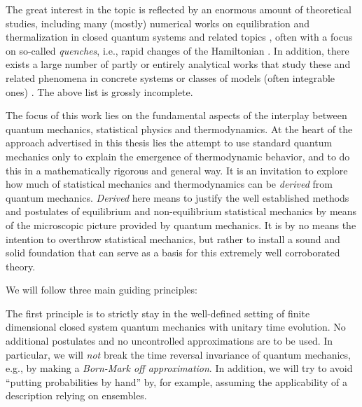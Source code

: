 \documentclass[a4paper,12pt,listof=totoc,index=totoc,bibliography=totoc,headsepline=false,headings=normal,BCOR16.153846mm,DIV12,headinclude,twoside,cleardoublepage=empty,numbers=noenddot,final]{scrreprt}
\theoremstyle{mystyle}
\numberwithin{equation}{section}
\numberwithin{figure}{section}
\numberwithin{lemma}{section}
\numberwithin{theorem}{section}
\numberwithin{corollary}{section}
\numberwithin{definition}{section}
\numberwithin{conjecture}{section}
\numberwithin{observation}{section}
\newcommand{\+}{\mkern2mu}
\DeclareMathOperator{\1}{\mathds{1}}
\begin{document}
The great interest in the topic is reflected by an enormous amount of theoretical studies, including many (mostly) numerical works on equilibration and thermalization in closed quantum systems and related topics \cite{Sirker2013,1109.5904v1,1110.4690v1,Rigol07,Zhuang2013,PhysRevE.81.06,Lesanovsky10,Beugeling2013,1112.3424v1.pd,Beugeling2013,Yukalov2011,Ikeda2013a,Fine2013,Jensen1985}, often with a focus on so-called \emph{quenches}, i.e., rapid changes of the Hamiltonian \cite{Moeckel2008,Kollath07,Rigol08,Rigol09,1011.0781v1,Venuti09,1108.2703v1,1109.5904v1,Rigol11,Rigol2006,Cassidy11,1102.0528v1,Torres-Herrera2013,1103.0787v1,1102.3651v1,1108.0928v1,Mazza2013}.
In addition, there exists a large number of partly or entirely analytical works that study these and related phenomena in concrete systems or classes of models (often integrable ones) \cite{Sengupta2004,Flesch08,Ates2011,Fagotti2012,Calabrese2007,Cazalilla2006,Fioretto2010,1104.0154v1,Cazalilla11,Eckstein2008,Campos10,1206.2408v1,Karzig2010,Iucci2010,Iucci2010,Iucci2009,Geiger2013,Queisser2013,Kehrein2013}.
The above list is grossly incomplete.

The focus of this work lies on the fundamental aspects of the interplay between quantum mechanics, statistical physics and thermodynamics.
At the heart of the approach advertised in this thesis lies the attempt to use standard quantum mechanics only to explain the emergence of thermodynamic behavior, and to do this in a mathematically rigorous and general way.
It is an invitation to explore how much of statistical mechanics and thermodynamics can be \emph{derived} from quantum mechanics.
\emph{Derived} here means to justify the well established methods and postulates of equilibrium and non-equilibrium statistical mechanics by means of the microscopic picture provided by quantum mechanics.
It is by no means the intention to overthrow statistical mechanics, but rather to install a sound and solid foundation that can serve as a basis for this extremely well corroborated theory.

We will follow three main guiding principles:

The first principle is to strictly stay in the well-defined setting of finite dimensional closed system quantum mechanics with unitary time evolution.
No additional postulates and no uncontrolled approximations are to be used.
In particular, we will \emph{not} break the time reversal invariance of quantum mechanics, e.g., by making a \emph{Born-Mark off approximation}.
In addition, we will try to avoid ``putting probabilities by hand'' by, for example, assuming the applicability of a description relying on ensembles.
\end{document}
